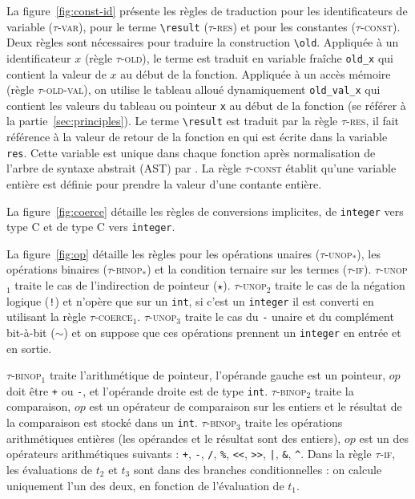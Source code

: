 La figure~\ref{fig:const-id} présente les règles de traduction pour les
identificateurs de variable (\textsc{$\tau$-var}), pour le terme
\lstinline|\result| (\textsc{$\tau$-res}) et pour les constantes
(\textsc{$\tau$-const}).
Deux règles sont nécessaires pour traduire la construction \eacsl
\lstinline|\old|.
Appliquée à un identificateur $x$ (règle \textsc{$\tau$-old}), le terme est
traduit en variable fraîche \lstinline|old_x| qui contient la valeur de $x$ au
début de la fonction.
Appliquée à un accès mémoire (règle \textsc{$\tau$-old-val}), on utilise le
tableau alloué dynamiquement \lstinline|old_val_x| qui contient les valeurs du
tableau ou pointeur \lstinline'x' au début de la fonction (se référer à la
partie~\ref{sec:principles}).
Le terme \lstinline|\result| est traduit par la règle \textsc{$\tau$-res}, il
fait référence à la valeur de retour de la fonction en \eacsl qui est écrite
dans la variable \lstinline|res|.
Cette variable est unique dans chaque fonction après normalisation de l'arbre de
syntaxe abstrait (AST) par \framac.
La règle \textsc{$\tau$-const} établit qu'une variable entière est définie pour
prendre la valeur d'une contante entière.

La figure~\ref{fig:coerce} détaille les règles de conversions implicites, de
\lstinline'integer' vers type C et de type C vers \lstinline'integer'.

La figure~\ref{fig:op} détaille les règles pour les opérations unaires
(\textsc{$\tau$-unop$_{*}$}), les opérations binaires
(\textsc{$\tau$-binop$_{*}$}) et la condition ternaire sur les termes
(\textsc{$\tau$-if}).
\textsc{$\tau$-unop$_1$} traite le cas de l'indirection de pointeur ($\star$).
\textsc{$\tau$-unop$_2$} traite le cas de la négation logique (\lstinline|!|) et
n'opère que sur un \lstinline'int', si c'est un \lstinline'integer' il est
converti en utilisant la règle \textsc{$\tau$-coerce$_1$}.
\textsc{$\tau$-unop$_3$} traite le cas du \lstinline|-| unaire et du complément
bit-à-bit ($\sim$) et on suppose que ces opérations prennent un
\lstinline'integer' en entrée et en sortie.

\textsc{$\tau$-binop$_1$} traite l'arithmétique de pointeur, l'opérande gauche
est un pointeur, $op$ doit être \lstinline|+| ou \lstinline|-|, et l'opérande
droite est de type \lstinline'int'.
\textsc{$\tau$-binop$_2$} traite la comparaison, $op$ est un opérateur de
comparaison sur les entiers et le résultat de la comparaison est stocké dans un
\lstinline|int|.
\textsc{$\tau$-binop$_3$} traite les opérations arithmétiques entières (les
opérandes et le résultat sont des entiers), $op$ est un des opérateurs
arithmétiques suivants : \lstinline|+|, \lstinline|-|, \lstinline|/|,
\lstinline|%|, \lstinline|<<|, \lstinline|>>|, \lstinline{|}, \lstinline|&|,
\lstinline|^|.
Dans la règle \textsc{$\tau$-if}, les évaluations de $t_2$ et $t_3$ sont dans
des branches conditionnelles : on calcule uniquement l'un des deux, en fonction
de l'évaluation de $t_1$.

